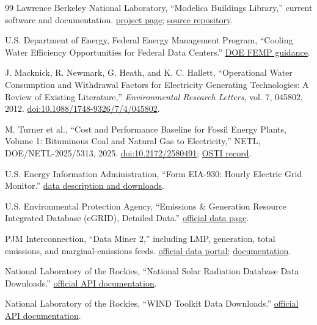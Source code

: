 \documentclass[10pt]{article}
\begin{document}
\begin{thebibliography}{99}
Lawrence Berkeley National Laboratory, ``Modelica Buildings Library,'' current software and documentation. \href{https://simulationresearch.lbl.gov/modelica/}{project page}; \href{https://github.com/lbl-srg/modelica-buildings}{source repository}.

U.S. Department of Energy, Federal Energy Management Program, ``Cooling Water Efficiency Opportunities for Federal Data Centers.'' \href{https://www.energy.gov/cmei/femp/cooling-water-efficiency-opportunities-federal-data-centers}{DOE FEMP guidance}.

J. Macknick, R. Newmark, G. Heath, and K. C. Hallett, ``Operational Water Consumption and Withdrawal Factors for Electricity Generating Technologies: A Review of Existing Literature,'' \emph{Environmental Research Letters}, vol. 7, 045802, 2012. \href{https://doi.org/10.1088/1748-9326/7/4/045802}{doi:10.1088/1748-9326/7/4/045802}.

M. Turner et al., ``Cost and Performance Baseline for Fossil Energy Plants, Volume 1: Bituminous Coal and Natural Gas to Electricity,'' NETL, DOE/NETL-2025/5313, 2025. \href{https://doi.org/10.2172/2580491}{doi:10.2172/2580491}; \href{https://www.osti.gov/biblio/2580491}{OSTI record}.

U.S. Energy Information Administration, ``Form EIA-930: Hourly Electric Grid Monitor.'' \href{https://www.eia.gov/electricity/gridmonitor/about}{data description and downloads}.

U.S. Environmental Protection Agency, ``Emissions \& Generation Resource Integrated Database (eGRID), Detailed Data.'' \href{https://www.epa.gov/egrid/detailed-data}{official data page}.

PJM Interconnection, ``Data Miner 2,'' including LMP, generation, total emissions, and marginal-emissions feeds. \href{https://dataminer2.pjm.com/}{official data portal}; \href{https://www.pjm.com/markets-and-operations/etools/data-miner-2}{documentation}.

National Laboratory of the Rockies, ``National Solar Radiation Database Data Downloads.'' \href{https://developer.nrel.gov/docs/solar/nsrdb/}{official API documentation}.

National Laboratory of the Rockies, ``WIND Toolkit Data Downloads.'' \href{https://developer.nrel.gov/docs/wind/wind-toolkit/}{official API documentation}.


\end{thebibliography}
\end{document}
